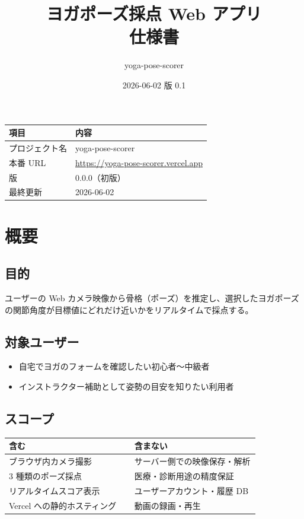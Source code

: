 \documentclass[a4paper,11pt]{ltjsarticle}
\title{ヨガポーズ採点 Web アプリ\\仕様書}
\author{yoga-pose-scorer}
\date{2026-06-02 \quad 版 0.1}
\begin{document}
\maketitle
\thispagestyle{fancy}

\begin{table}[h]
  \centering
  \begin{tabular}{@{}ll@{}}
    \toprule
    項目 & 内容 \\
    \midrule
    プロジェクト名 & yoga-pose-scorer \\
    本番 URL & \url{https://yoga-pose-scorer.vercel.app} \\
    版 & 0.0.0（初版） \\
    最終更新 & 2026-06-02 \\
    \bottomrule
  \end{tabular}
\end{table}

\tableofcontents
\newpage

\section{概要}

\subsection{目的}

ユーザーの Web カメラ映像から骨格（ポーズ）を推定し、選択したヨガポーズの関節角度が目標値にどれだけ近いかをリアルタイムで採点する。

\subsection{対象ユーザー}

\begin{itemize}
  \item 自宅でヨガのフォームを確認したい初心者〜中級者
  \item インストラクター補助として姿勢の目安を知りたい利用者
\end{itemize}

\subsection{スコープ}

\begin{table}[h]
  \centering
  \begin{tabular}{@{}p{0.42\linewidth}p{0.42\linewidth}@{}}
    \toprule
    含む & 含まない \\
    \midrule
    ブラウザ内カメラ撮影 & サーバー側での映像保存・解析 \\
    3 種類のポーズ採点 & 医療・診断用途の精度保証 \\
    リアルタイムスコア表示 & ユーザーアカウント・履歴 DB \\
    Vercel への静的ホスティング & 動画の録画・再生 \\
    \bottomrule
  \end{tabular}
\end{table}
\end{document}

